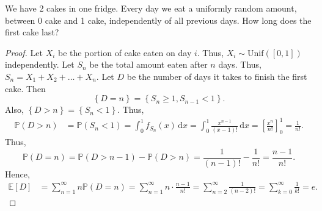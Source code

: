 \begin{eg}
    We have 2 cakes in one fridge. Every day we eat a uniformly random amount, between 0 cake and 1 cake, independently of all previous days. How long does the first cake last?  
\end{eg}

\begin{proof}
    Let \(X_i\) be the portion of cake eaten on day \(i\). Thus, \(X_i \sim \mathrm{Unif}([0, 1]) \) independently. Let \(S_n\) be the total amount eaten after \(n\) days. Thus, \(S_n = X_1 + X_2 + \dots + X_n\). Let \(D\) be the number of days it takes to finish the first cake. Then 
    \[
        \left\{ D = n \right\} = \left\{ S_n \ge 1, S_{n-1} < 1 \right\}.  
    \]       
    Also, \(\left\{ D > n \right\} = \left\{ S_n < 1 \right\}  \). Thus,
    \begin{align*}
        \mathbb{P} (D > n) &= \mathbb{P} (S_n < 1) = \int _0^1 f_{S_n}(x) \, \mathrm{d} x = \int _0^1 \frac{x^{n-1}}{(x-1)!} \, \mathrm{d} x = \left[ \frac{x^n}{n!} \right]_0^1 = \frac{1}{n!}.  
    \end{align*}
    Thus,
    \[
        \mathbb{P} (D = n) = \mathbb{P} (D > n - 1) - \mathbb{P} (D > n) = \frac{1}{(n-1)!} - \frac{1}{n!} = \frac{n-1}{n!}.
    \]
    Hence,
    \begin{align*}
        \mathbb{E} [D] &= \sum_{n=1}^{\infty} n \mathbb{P} (D = n) = \sum_{n=1}^{\infty} n \cdot \frac{n-1}{n!} = \sum_{n=2}^{\infty} \frac{1}{(n-2)!} = \sum_{k=0}^{\infty} \frac{1}{k!} = e.    
    \end{align*}
\end{proof}


